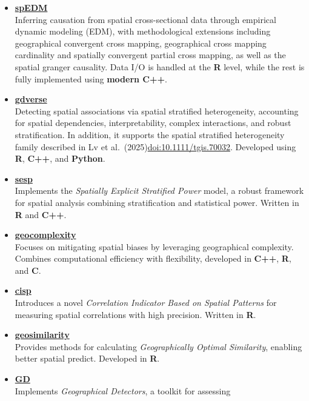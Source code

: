 \documentclass[11pt,a4paper,]{moderncv}
\begin{document}
\begin{itemize}
\item
  \textbf{\href{https://github.com/stscl/spEDM}{spEDM}}\\
  Inferring causation from spatial cross-sectional data through
  empirical dynamic modeling (EDM), with methodological extensions
  including geographical convergent cross mapping, geographical cross
  mapping cardinality and spatially convergent partial cross mapping, as
  well as the spatial granger causality. Data I/O is handled at the
  \textbf{R} level, while the rest is fully implemented using
  \textbf{modern C++}.
\item
  \textbf{\href{https://github.com/stscl/gdverse}{gdverse}}\\
  Detecting spatial associations via spatial stratified heterogeneity,
  accounting for spatial dependencies, interpretability, complex
  interactions, and robust stratification. In addition, it supports the
  spatial stratified heterogeneity family described in Lv et
  al.~(2025)\url{doi:10.1111/tgis.70032}. Developed using \textbf{R},
  \textbf{C++}, and \textbf{Python}.
\item
  \textbf{\href{https://github.com/stscl/sesp}{sesp}}\\
  Implements the \emph{Spatially Explicit Stratified Power} model, a
  robust framework for spatial analysis combining stratification and
  statistical power. Written in \textbf{R} and \textbf{C++}.
\item
  \textbf{\href{https://github.com/ausgis/geocomplexity}{geocomplexity}}\\
  Focuses on mitigating spatial biases by leveraging geographical
  complexity. Combines computational efficiency with flexibility,
  developed in \textbf{C++}, \textbf{R}, and \textbf{C}.
\item
  \textbf{\href{https://github.com/stscl/cisp}{cisp}}\\
  Introduces a novel \emph{Correlation Indicator Based on Spatial
  Patterns} for measuring spatial correlations with high precision.
  Written in \textbf{R}.
\item
  \textbf{\href{https://github.com/ausgis/geosimilarity}{geosimilarity}}\\
  Provides methods for calculating \emph{Geographically Optimal
  Similarity}, enabling better spatial predict. Developed in \textbf{R}.
\item
  \textbf{\href{https://github.com/ausgis/GD}{GD}}\\
  Implements \emph{Geographical Detectors}, a toolkit for assessing

\end{itemize}
\end{document}
